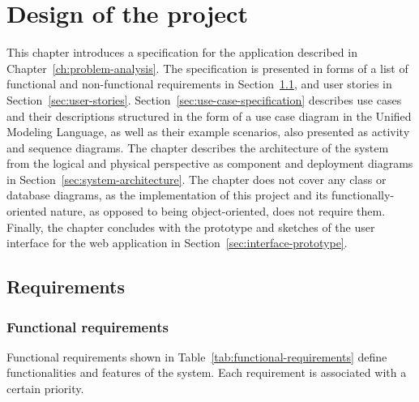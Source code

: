 \documentclass[english,bachelors,forcepolishlogotype]{wizthesis}
\begin{document}
\chapter{Design of the project} \label{ch:design-of-the-project}

This chapter introduces a specification for the application described in
Chapter~\ref{ch:problem-analysis}. The specification is presented in forms of a
list of functional and non-functional requirements in
Section~\ref{sec:requirements}, and user stories in
Section~\ref{sec:user-stories}. Section~\ref{sec:use-case-specification}
describes use cases and their descriptions structured in the form of a use case
diagram in the Unified Modeling Language, as well as their example scenarios,
also presented as activity and sequence diagrams. The chapter describes the
architecture of the system from the logical and physical perspective as
component and deployment diagrams in Section~\ref{sec:system-architecture}. The
chapter does not cover any class or database diagrams, as the implementation of
this project and its functionally-oriented nature, as opposed to being
object-oriented, does not require them. Finally, the chapter concludes with the
prototype and sketches of the user interface for the web application in
Section~\ref{sec:interface-prototype}.

\section{Requirements} \label{sec:requirements}

\subsection{Functional requirements}

Functional requirements shown in Table~\ref{tab:functional-requirements} define
functionalities and features of the system. Each requirement is associated with
a certain priority.
\end{document}

